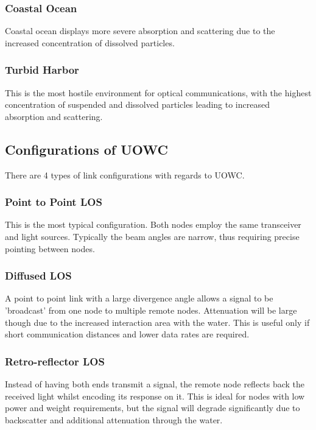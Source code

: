 \documentclass{article}
\begin{document}
\subsubsection{Coastal Ocean}
Coastal ocean displays more severe absorption and scattering due to the
increased concentration of dissolved particles.

\subsubsection{Turbid Harbor}
This is the most hostile environment for optical communications,
with the highest concentration of suspended and dissolved particles
leading to increased absorption and scattering.




\subsection{Configurations of UOWC}
There are 4 types of link configurations with regards to \ac{UOWC}.

\subsubsection{Point to Point \ac{LOS}}
This is the most typical configuration. Both nodes employ the same
transceiver and light sources. Typically the beam angles are narrow, thus
requiring precise pointing between nodes.

\subsubsection{Diffused \ac{LOS}}
A point to point link with a large divergence angle allows a signal to be
'broadcast' from one node to multiple remote nodes. Attenuation will be large
though due to the increased interaction area with the water. This is useful
only if short communication distances and lower data rates are required.

\subsubsection{Retro-reflector \ac{LOS}}

Instead of having both ends transmit a signal, the remote node reflects back
the received light whilst encoding its response on it. This is ideal for nodes
with low power and weight requirements, but the signal will degrade
significantly due to backscatter and additional attenuation through the water.
\end{document}
